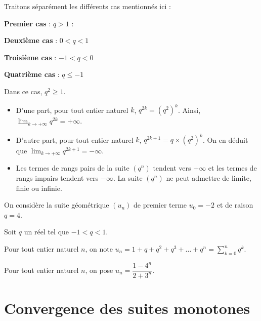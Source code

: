 \documentclass[11pt,fleqn, openany]{book} %
\begin{document}
\begin{demonstration} Traitons séparément les différents cas mentionnés ici :

\textbf{Premier cas} : $q>1$ :

\vskip60pt

\textbf{Deuxième cas} : $0 < q < 1$

\vskip60pt

\textbf{Troisième cas} : $-1 < q <0$



\newpage

\textbf{Quatrième cas} : $q \leqslant -1$

Dans ce cas, $q^2 \geqslant 1$.
\begin{itemize}
\item D'une part, pour tout entier naturel $k$, $q^{2k}=(q^2)^k$. Ainsi, $\displaystyle \lim_{k \to +\infty} q^{2k} = +\infty$.
\item D'autre part, pour tout entier naturel $k$, $q^{2k+1}=q\times (q^2)^k$. On en déduit que $\displaystyle \lim_{k \to +\infty} q^{2k+1} = -\infty$.
\item Les termes de rangs pairs de la suite $(q^n)$ tendent vers $+\infty$ et les termes de rangs impairs tendent vers $-\infty$. La suite $(q^n)$ ne peut admettre de limite, finie ou infinie.
\end{itemize}\end{demonstration}

\begin{example} On considère la suite géométrique $(u_n)$ de premier terme $u_0=-2$ et de raison $q=4$.
\vskip30pt
\end{example}

\begin{example} Soit $q$ un réel tel que $-1< q < 1$. 

Pour tout entier naturel $n$, on note $u_n=1+q+q^2+q^3+\ldots + q^n = \displaystyle \sum_{k=0}^n q^k$.
\vskip100pt
\end{example}

\begin{example}Pour tout entier naturel $n$, on pose $u_n = \dfrac{1-4^n}{2+3^n}$. 

\vskip100pt
\end{example}


\newpage

\section{Convergence des suites monotones}
\end{document}
